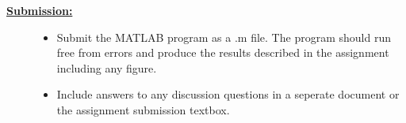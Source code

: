 \documentclass[12pt]{article}
\newcommand{\ANUM}{8} %
\begin{document}
\begin{description}
\begin{enumerate}
\end{enumerate}

\newpage	



\item[\textbf{\underline{Submission:}}] \hfill \vspace{0mm}

	\begin{itemize}

		\item Submit the MATLAB program as a .m file. The program should run free from errors and produce the results described in the assignment including any figure. 

		\item Include answers to any discussion questions in a seperate document or the assignment submission textbox. 

	\end{itemize}		



\end{description}
\end{document}
